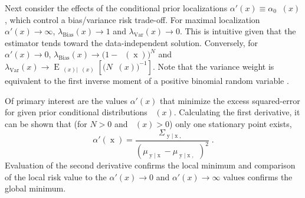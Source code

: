 \documentclass{article}
\DeclareMathOperator{\xrm}{\mathrm{x}}
\DeclareMathOperator{\yrm}{\mathrm{y}}
\DeclareMathOperator{\Erm}{\mathrm{E}}
\DeclareMathOperator{\thetam}{\theta_\text{m}}
\DeclareMathOperator{\upthetam}{\uptheta_\text{m}}
\DeclareMathOperator{\upthetac}{\uptheta_\text{c}}
\DeclareMathOperator{\uppsim}{\uppsi_\text{m}}
\DeclareMathOperator{\alpham}{\alpha_\text{m}}
\DeclareMathOperator{\alphac}{\alpha_\text{c}}
\begin{document}
Next consider the effects of the conditional prior localizations $\alpha'(x) \equiv \alpha_0 \alpham(x)$, which control a bias/variance risk trade-off. For maximal localization $\alpha'(x) \to \infty$, $\lambda_{\text{Bias}}(x) \to 1$ and $\lambda_{\text{Var}}(x) \to 0$. This is intuitive given that the estimator tends toward the data-independent solution. Conversely, for $\alpha'(x) \to 0$, $\lambda_{\text{Bias}}(x) \to \big( 1 - \upthetam(\xrm) \big)^N$ and $\lambda_{\text{Var}}(x) \to \Erm_{\uppsim(x) | \upthetam(x)}\left[ \big( N \uppsim(x) \big)^{-1} \right]$. Note that the variance weight is equivalent to the first inverse moment of a positive binomial random variable \cite{stephan}. 


Of primary interest are the values $\alpha'(x)$ that minimize the excess squared-error for given prior conditional distributions $\alphac(x)$. Calculating the first derivative, it can be shown that (for $N > 0$ and $\thetam(x) > 0$) only one stationary point exists, 
\begin{equation} \label{eq:alpha_x_min_Rex}
\alpha'(\xrm) = \frac{\Sigma_{\yrm | \xrm,\upthetac}}{\left( \mu_{\yrm | \xrm} - \mu_{\yrm | \xrm,\upthetac} \right)^2} \;.
\end{equation}
Evaluation of the second derivative confirms the local minimum and comparison of the local risk value to the $\alpha'(x) \to 0$ and $\alpha'(x) \to \infty$ values confirms the global minimum.
\end{document}
